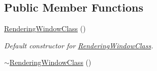\subsection*{Public Member Functions}
\begin{DoxyCompactItemize}
\item 
\hyperlink{classRenderingWindowClass_ad48948a08088e973aac8a57c96dee52c}{Rendering\-Window\-Class} ()
\begin{DoxyCompactList}\small\item\em Default constructor for \hyperlink{classRenderingWindowClass}{Rendering\-Window\-Class}. \end{DoxyCompactList}\item 
\hypertarget{classRenderingWindowClass_a10c28c3d432aa2e7864284301496fa85}{\hyperlink{classRenderingWindowClass_a10c28c3d432aa2e7864284301496fa85}{$\sim$\-Rendering\-Window\-Class} ()}\label{classRenderingWindowClass_a10c28c3d432aa2e7864284301496fa85}


\end{DoxyCompactItemize}
